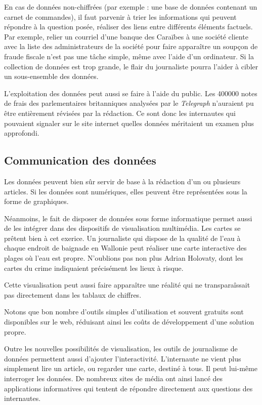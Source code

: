 En cas de données non-chiffrées (par exemple : une base de données contenant un carnet
de commandes), il faut parvenir à trier les informations qui peuvent répondre à la 
question posée, réaliser des liens entre différents éléments factuels.
Par exemple, relier un courriel d'une banque des Caraïbes à une société cliente avec 
la liste des administrateurs de la société pour faire apparaître un soupçon de fraude 
fiscale n'est pas une tâche simple, même avec l'aide d'un ordinateur.
Si la collection de données est trop grande, le flair du journaliste pourra l'aider
à cibler un sous-ensemble des données.


L'exploitation des données peut aussi se faire à l'aide du public. Les 400000 notes 
de frais des 
parlementaires britanniques analysées par le \textit{Telegraph} n'auraient pu être
entièrement révisées par la rédaction. Ce sont donc les internautes qui pouvaient
signaler sur le site internet quelles données méritaient un examen plus approfondi. 


\subsection{Communication des données}

Les données peuvent bien sûr servir de base à la rédaction d'un ou plusieurs articles.
Si les données sont numériques, elles peuvent être représentées sous la forme de 
graphiques.

Néanmoins, le fait de disposer de données sous forme informatique permet aussi de 
les intégrer dans des dispositifs de visualisation multimédia.
Les cartes se prêtent bien à cet exerice. Un journaliste qui dispose de la qualité
de l'eau à chaque endroit de baignade en Wallonie peut réaliser une carte interactive
des plages où l'eau est propre. N'oublions pas non plus Adrian Holovaty, dont les \og 
cartes du crime \fg indiquaient précisément les lieux à risque.

Cette visualisation peut aussi faire apparaître une réalité qui ne transparaîssait 
pas directement dans les tablaux de chiffres. 

Notons que bon nombre d'outils simples d'utilisation et souvent gratuits sont 
disponibles sur le web, réduisant ainsi les coûts de développement d'une solution
propre.

Outre les nouvelles possibilités de visualisation, les outils de journalisme de
données permettent aussi d'ajouter l'interactivité. L'internaute ne vient plus
simplement lire un article, ou regarder une carte, destiné à tous. Il peut lui-même
interroger les données. De nombreux sites de média ont ainsi lancé des 
applications informatives qui tentent de répondre directement aux questions des internautes.

